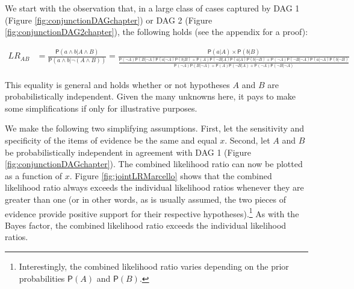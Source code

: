 \documentclass[
  10pt,
  dvipsnames,enabledeprecatedfontcommands]{scrartcl}
\newcommand{\pr}[1]{\ensuremath{\mathsf{P}(#1)}}
\begin{document}
We start with the observation that, in a large class of cases captured
by \textsf{DAG 1} (Figure \ref{fig:conjunctionDAGchapter}) or
\textsf{DAG 2} (Figure \ref{fig:conjunctionDAG2chapter}), the following
holds (see the appendix for a proof):

\begin{align*}
LR_{AB} & = \frac{\pr{a\wedge b \vert A\wedge B}}{\pr{a \wedge b \vert \neg (A\wedge B)}} = \frac{\pr{a \vert A} \times \pr{b \vert B}}
 {\frac{\pr{\neg A}\pr{B \vert \neg A} \pr{a \vert \neg A}\pr{b \vert B} + \pr{A}\pr{\neg B \vert A} \pr{a \vert A }\pr{b \vert \neg B} + \pr{\neg A}\pr{\neg B \vert \neg A } \pr{a \vert \neg A}\pr{b \vert \neg B}}{\pr{\neg A}\pr{B \vert \neg A} + \pr{A}\pr{\neg B \vert A } + \pr{\neg A}\pr{\neg B \vert \neg A} }}
\end{align*}

\noindent This equality is general and holds whether or not hypotheses
\(A\) and \(B\) are probabilistically independent. Given the many
unknowns here, it pays to make some simplifications if only for
illustrative purposes.

We make the following two simplifying assumptions. First, let the
sensitivity and specificity of the items of evidence be the same and
equal \(x\). Second, let \(A\) and \(B\) be probabilistically
independent in agreement with \textsf{DAG 1} (Figure
\ref{fig:conjunctionDAGchapter}). The combined likelihood ratio can now
be plotted as a function of \(x\). Figure \ref{fig:jointLRMarcello}
shows that the combined likelihood ratio always exceeds the individual
likelihood ratios whenever they are greater than one (or in other words,
as is usually assumed, the two pieces of evidence provide positive
support for their respective hypotheses).\footnote{Interestingly, the
  combined likelihood ratio varies depending on the prior probabilities
  \(\pr{A}\) and \(\pr{B}\).} As with the Bayes factor, the combined
likelihood ratio exceeds the individual likelihood ratios.
\end{document}

